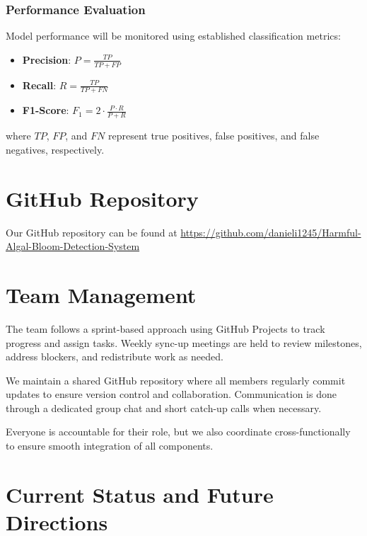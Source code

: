 \documentclass[12pt]{article}
\begin{document}
\subsubsection{Performance Evaluation}
Model performance will be monitored using established classification metrics:
\begin{itemize}
    \item \textbf{Precision}: $P = \frac{TP}{TP + FP}$
    \item \textbf{Recall}: $R = \frac{TP}{TP + FN}$
    \item \textbf{F1-Score}: $F_1 = 2 \cdot \frac{P \cdot R}{P + R}$
\end{itemize}

where $TP$, $FP$, and $FN$ represent true positives, false positives, and false negatives, respectively.



\section{GitHub Repository}
Our GitHub repository can be found at \href{https://github.com/danieli1245/Harmful-Algal-Bloom-Detection-System}{https://github.com/danieli1245/Harmful-Algal-Bloom-Detection-System} 



\section{Team Management}
The team follows a sprint-based approach using GitHub Projects to track progress and assign tasks. Weekly sync-up meetings are held to review milestones, address blockers, and redistribute work as needed.

We maintain a shared GitHub repository where all members regularly commit updates to ensure version control and collaboration. Communication is done through a dedicated group chat and short catch-up calls when necessary.

Everyone is accountable for their role, but we also coordinate cross-functionally to ensure smooth integration of all components.

\section{Current Status and Future Directions}
\end{document}
